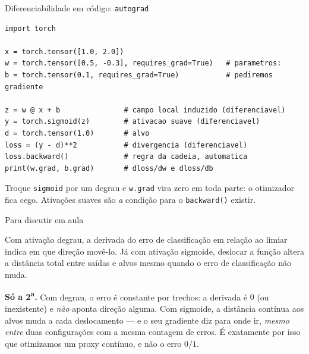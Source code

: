 \documentclass[aspectratio=169, 11pt]{beamer}
\begin{document}
\begin{frame}[fragile]{Diferenciabilidade em código: \texttt{autograd}}

\begin{lstlisting}
import torch

x = torch.tensor([1.0, 2.0])
w = torch.tensor([0.5, -0.3], requires_grad=True)   # parametros:
b = torch.tensor(0.1, requires_grad=True)           # pediremos gradiente

z = w @ x + b               # campo local induzido (diferenciavel)
y = torch.sigmoid(z)        # ativacao suave (diferenciavel)
d = torch.tensor(1.0)       # alvo
loss = (y - d)**2           # divergencia (diferenciavel)
loss.backward()             # regra da cadeia, automatica
print(w.grad, b.grad)       # dloss/dw e dloss/db
\end{lstlisting}

  \begin{ideiabox}
    Troque \texttt{sigmoid} por um degrau e \texttt{w.grad} vira zero em toda
    parte: o otimizador fica cego. Ativações suaves são \emph{a} condição
    para o \texttt{backward()} existir.
  \end{ideiabox}
\end{frame}

\begin{frame}{Para discutir em aula}
  \begin{quizbox}
    Com ativação degrau, a derivada do erro de classificação em relação ao
    limiar indica em que direção movê-lo. Já com ativação sigmoide, deslocar a
    função altera a distância total entre saídas e alvos mesmo quando o erro
    de classificação não muda.

    \smallskip
  \end{quizbox}

  \pause

  \begin{respbox}
    \textbf{Só a 2\textsuperscript{a}.} Com degrau, o erro é constante por
    trechos: a derivada é $0$ (ou inexistente) e \emph{não} aponta direção
    alguma. Com sigmoide, a distância contínua aos alvos muda a cada
    deslocamento — e o seu gradiente diz para onde ir, \emph{mesmo entre}
    duas configurações com a mesma contagem de erros. É exatamente por isso
    que otimizamos um \alert{proxy contínuo}, e não o erro $0/1$.
  \end{respbox}
\end{frame}
\end{document}
